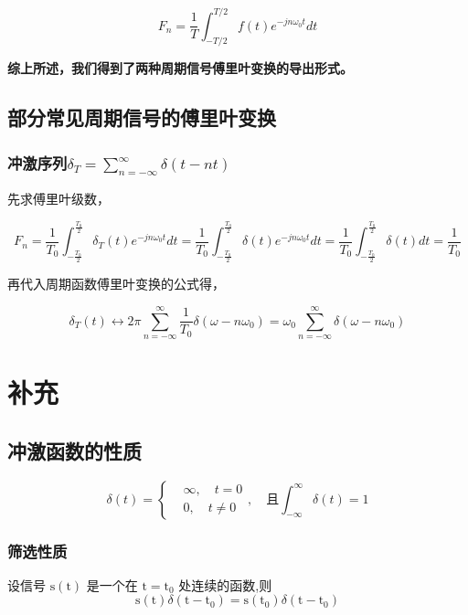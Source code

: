 \documentclass[UTF8]{article}
\theoremstyle{definition}
\begin{document}
\begin{equation*}
F_n=\frac{1}{T} \int_{-T / 2}^{T / 2} f(t) e^{-j n \omega_0 t} d t
\end{equation*}


\textbf{综上所述，我们得到了两种周期信号傅里叶变换的导出形式。}

\subsection{部分常见周期信号的傅里叶变换}
\subsubsection{冲激序列$\delta_{T} = \sum_{n=-\infty}^\infty \delta(t-nt)$}

先求傅里叶级数，

\begin{equation*}
F_n = \frac{1}{T_0}\int_{-\frac{T_0}{2}}^{\frac{T_0}{2}} \delta_{T}(t) e^{-jn\omega_0t}dt =  \frac{1}{T_0}\int_{-\frac{T_0}{2}}^{\frac{T_0}{2}} \delta(t) e^{-jn\omega_0t}dt = \frac{1}{T_0}\int_{-\frac{T_0}{2}}^{\frac{T_0}{2}}\delta(t)dt=\frac{1}{T_0}
\end{equation*}

再代入周期函数傅里叶变换的公式得，

\begin{equation*}
\delta_{T}(t) \leftrightarrow 2\pi \sum_{n=-\infty}^\infty \frac{1}{T_0}\delta(\omega-n\omega_0) = \omega_0\sum_{n=-\infty}^\infty \delta(\omega-n\omega_0)
\end{equation*}


\section{补充}
\subsection{冲激函数的性质}

\begin{equation*}
    \delta(t) = \begin{cases}
        & \infty ,\quad t=0\\
        & 0,\quad  t\ne 0  
    \end{cases}, \quad \text{且} \int_{-\infty}^{\infty} \delta(t) = 1
\end{equation*}

\subsubsection{筛选性质}
设信号 $\mathrm{s}(\mathrm{t})$ 是一个在 $\mathrm{t}=\mathrm{t}_0$ 处连续的函数,则
\begin{equation*}
\mathrm{s}(\mathrm{t}) \delta\left(\mathrm{t}-\mathrm{t}_0\right)=\mathrm{s}\left(\mathrm{t}_0\right) \delta\left(\mathrm{t}-\mathrm{t}_0\right)
\end{equation*}
\end{document}
